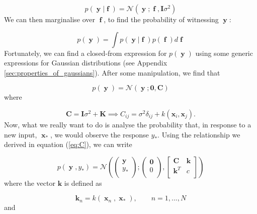 \documentclass[a4paper, 11pt]{article}
\DeclareMathOperator{\f}{\boldsymbol{f}}
\DeclareMathOperator{\x}{\boldsymbol{x}}
\DeclareMathOperator{\y}{\boldsymbol{y}}
\begin{document}
\begin{equation}
	p(\y|\f) = \mathcal{N}\left( \y; \f, \boldsymbol{I}\sigma^2 \right)
\end{equation}
We can then marginalise over $\f$, to find the probability of witnessing $\y$:

\begin{equation}
	p(\y) = \int p(\y|\f)p(\f) d\f
\end{equation}
Fortunately, we can find a closed-from expression for $p(\y)$ using some generic expressions for Gaussian distributions (see Appendix \ref{sec:properties_of_gaussians}). After some manipulation, we find that

\begin{equation}
	p(\y) = \mathcal{N}(\y;\boldsymbol{0},\boldsymbol{C})
	\label{eq:py}
\end{equation}
where

\begin{equation}
	\boldsymbol{C} = \boldsymbol{I}\sigma^2 + \boldsymbol{K} \implies C_{ij} = \sigma^2 \delta_{ij} + k(\boldsymbol{x}_i,\boldsymbol{x}_j).
	\label{eq:C}
\end{equation}
Now, what we really want to do is analyse the probability that, in response to a new input, $\x_*$, we would observe the response $y_*$. Using the relationship we derived in equation (\ref{eq:C}), we can write

\begin{equation}
p(\y,y_*) = \mathcal{N}\left( 
\left(
\begin{array}{c}
	\y \\
	y_* \\
\end{array}
\right);\left(
\begin{array}{c}
	\boldsymbol{0}\\
	0\\
\end{array}\right),	
\left[
  \begin{array}{cc}
    \boldsymbol{C} & \boldsymbol{k} \\
    \boldsymbol{k}^T & c \\
  \end{array}
\right]
 \right)
\end{equation}
where the vector $\boldsymbol{k}$ is defined as

\begin{equation}
	\boldsymbol{k}_n = k(\x_n,\x_*), \qquad n = 1,...,N
\end{equation}
and
\end{document}
